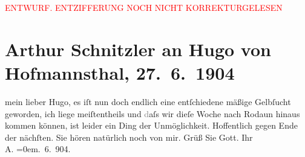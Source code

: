 
\begin{center}
            \textcolor{red}{ENTWURF. ENTZIFFERUNG NOCH NICHT KORREKTURGELESEN}
                      \end{center}
            
               \section[Arthur Schnitzler an Hugo von Hofmannsthal, 27. 6. 1904]{ Arthur Schnitzler an Hugo von Hofmannsthal, 27. 6. 1904}\nopagebreak{}\rehead{ }\begin{ledgroupsized}[t]{13cm}\normalsize\beginnumbering{} \toendnotes[C]{\smallbreak\pagebreak[2]} 
\pstart
           \noindent{}{\pb}mein lieber Hugo, es iſt nun doch endlich eine entſchiedene mäßige
               Gelbſucht geworden, ich liege meiſtentheils und \textcolor{gray}{d}aſs wir dieſe
               Woche nach Rodaun hinaus kommen können, ist leider
               ein Ding der Unmöglichkeit. Hoffentlich gegen Ende der nächſten.\pend
           \pstart
           Sie hören natürlich noch {\pb}von mir. Grüß Sie Gott.\pend
           \pstart
           Ihr{\\[\baselineskip]}\spacefill\mbox{A.}\pend
           \leftskip=0em{}. 6. 904.\pend
           \endnumbering{}\end{ledgroupsized}  \newcommand{\dateiname}{L01410}\newcommand{\titel}{Arthur Schnitzler an Hugo von Hofmannsthal, 27. 6. 1904}\newcommand{\editorInnen}{Martin Anton Müller und Gerd-Hermann Susen}
      